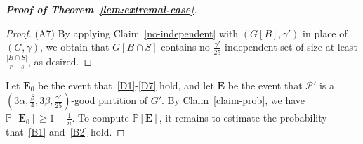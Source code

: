 \documentclass[11pt, a4paper]{article}
\theoremstyle{definition}
\newcommand{\<}{\subseteq}
\begin{document}
\begin{proof}[{\bf Proof of Theorem~\ref{lem:extremal-case}}]
\begin{proof}
(A7) %
By applying Claim~\ref{no-independent} with $(G[B],\gamma')$ in place of $(G,\gamma)$, we obtain that $G[B\cap S]$ contains no $\frac{\gamma'}{25}$-independent set of size at least $\frac{|B\cap S|}{r-s}$, as desired. 
\end{proof}


Let $\mathbf{E}_0$ be the event that~\ref{D1}-\ref{D7} hold, and let $\mathbf{E}$ be the event that $\mathcal{P}'$ is a $(3\alpha,\frac{\beta}{4},3\beta,\frac{\gamma'}{25})$-good partition of $G'$. 
By Claim~\ref{claim-prob}, we have $\mathbb{P}[\mathbf{E}_0]\geq 1-\frac{1}{n}$. %
To compute $\mathbb{P}[\mathbf{E}]$, it remains to estimate {the probability that~\ref{B1} and~\ref{B2} hold}. %



\end{proof}
\end{document}

